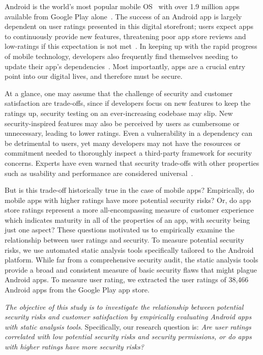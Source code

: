 \documentclass{sig-alternate-05-2015}
\newcommand{\sam}[1]{\textcolor{magenta}{{\it [Sam says: #1]}}}
\begin{document}
Android is the world's most popular mobile OS~\cite{OSMarketShare_URL} with over 1.9 million apps available from Google Play alone~\cite{appbrain_stats_url}. The success of an Android app is largely dependent on user ratings presented in this digital storefront; users expect apps to continuously provide new features, threatening poor app store reviews and low-ratings if this expectation is not met~\cite{Khalid2014}. In keeping up with the rapid progress of mobile technology, developers also frequently find themselves needing to update their app's dependencies~\cite{Syer2013}. Most importantly, apps are a crucial entry point into our digital lives, and therefore must be secure. %

At a glance, one may assume that the challenge of security and customer satisfaction are trade-offs, since if developers focus on new features to keep the ratings up, security testing on an ever-increasing codebase may slip. New security-inspired features may also be perceived by users as cumbersome or unnecessary, leading to lower ratings. Even a vulnerability in a dependency can be detrimental to users, yet many developers may not have the resources or commitment needed to thoroughly inspect a third-party framework for security concerns. Experts have even warned that security trade-offs with other properties such as usability and performance are considered universal~\cite{McGrawBSS}.

But is this trade-off historically true in the case of mobile apps? Empirically, do mobile apps with higher ratings have more potential security risks? Or, do app store ratings represent a more all-encompassing measure of customer experience which indicates maturity in all of the properties of an app, with security being just one aspect? These questions motivated us to empirically examine the relationship between user ratings and security. To measure potential security risks, we use automated static analysis tools specifically tailored to the Android platform. While far from a comprehensive security audit, the static analysis tools provide a broad and consistent measure of basic security flaws that might plague Android apps. To measure user rating, we extracted the user ratings of 38,466 Android apps from the Google Play app store.

\emph{The objective of this study is to investigate the relationship between potential security risks and customer satisfaction by empirically evaluating Android apps with static analysis tools}. Specifically, our research question is: \textit{Are user ratings correlated with low potential security risks and security permissions, or do apps with higher ratings have more security risks?}
\end{document}
